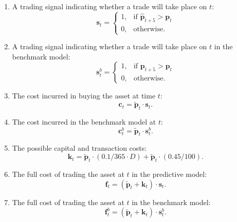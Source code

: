 \documentclass[a4paper,11pt,oneside]{article}
\theoremstyle{plain}
\theoremstyle{definition}
\begin{document}
	\begin{enumerate}
		\item A trading signal indicating whether a trade will take place on $t$:
		\begin{equation}\end{equation}
			\[\mathbf{s}_t= 
				\begin{cases}
				1,& \text{if } \mathbf{\hat{p}}_{t+5} > \mathbf{p}_t\\
				0,              & \text{otherwise.}
				\end{cases}
				\]

		\item A trading signal indicating whether a trade will take place on $t$ in the benchmark model:
				\begin{equation}\end{equation}
				\[\mathbf{s}^b_t= 
				\begin{cases}
				1,& \text{if } \mathbf{{p}}_{t+5} > \mathbf{p}_t\\
				0,              & \text{otherwise.}
				\end{cases}
				\]
		
		\item The cost incurred in buying the asset at time $t$:
		\begin{equation}
			\mathbf{c}_t = \mathbf{\tilde{p}}_t \cdot \mathbf{s}_t .
		\end{equation}
		\item The cost incurred in the benchmark model at $t$:
		\begin{equation}
				\mathbf{c}^b_{t} = \mathbf{\tilde{p}}_t \cdot \mathbf{s}^b_{t} .
		\end{equation}
		\item The possible capital and transaction costs:
		\begin{equation}\label{eq_capital_costs}
			\mathbf{k}_t= \mathbf{\tilde{p}}_t \cdot (0.1 / 365 \cdot D) + \mathbf{\tilde{p}}_t \cdot (0.45 / 100) .
		\end{equation}
		\item The full cost of trading the asset at $t$ in the predictive model:
		\begin{equation}
			\mathbf{f}_t = (\mathbf{\tilde{p}}_t + \mathbf{k}_t) \cdot \mathbf{s}_t .
		\end{equation}	
		\item The full cost of trading the asset at $t$ in the benchmark model:
		\begin{equation}
			\mathbf{f}^b_{t} = (\mathbf{\tilde{p}}_t + \mathbf{k}_t) \cdot \mathbf{s}^b_{t} .
		\end{equation}
		

\end{enumerate}
\end{document}
